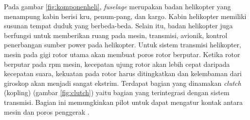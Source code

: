 Pada gambar \ref{fig:komponenheli}, \textit{fuselage} merupakan badan helikopter yang menampung kabin berisi kru, penum\hyp{}pang, dan kargo. Kabin helikopter memiliki susunan tempat duduk yang berbeda-beda. Selain itu, badan helikopter juga berfungsi untuk memberikan ruang pada mesin, transmisi, avionik, kontrol penerbangan sumber power pada helikopter. Untuk sistem transmisi helikopter, mesin pada gigi rotor utama akan membuat poros rotor berputar. Ketika rotor berputar pada rpm mesin, kecepatan ujung rotor akan lebih cepat daripada kecepatan suara, kekuatan pada rotor harus ditingkatkan dan kelembaman dari giroskop akan menjadi sangat ekstrim. Terdapat bagian yang dinamakan \textit{clutch} (kopling) (gambar \ref{fig:clutch}) yaitu bagian yang terintegrasi dengan sistem transmisi. Bagian ini memungkinkan pilot untuk dapat mengatur kontak antara mesin dan poros penggerak \cite{wagtendonk2006principles}.

